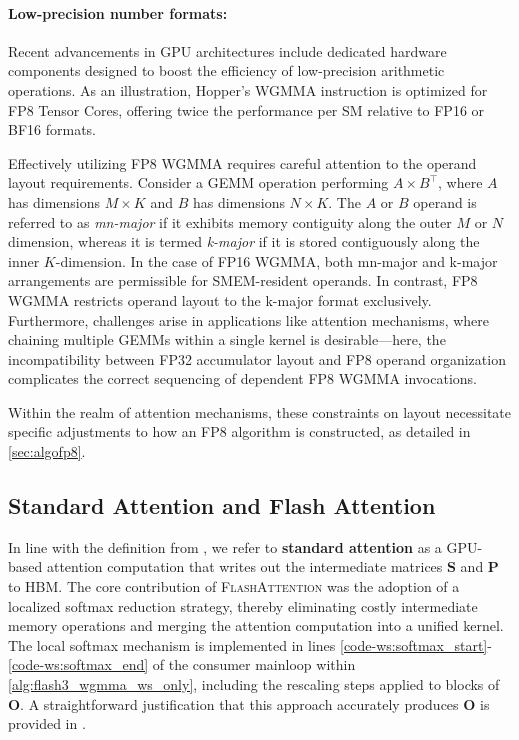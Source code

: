 \begin{enumerate}
\paragraph{Low-precision number formats:}
\label{sec:low-precision-gpu}
Recent advancements in GPU architectures include dedicated hardware components designed to boost the efficiency of low-precision arithmetic operations. As an illustration, Hopper’s WGMMA instruction is optimized for FP8 Tensor Cores, offering twice the performance per SM relative to FP16 or BF16 formats.

Effectively utilizing FP8 WGMMA requires careful attention to the operand layout requirements. Consider a GEMM operation performing $A \times B^{\top}$, where $A$ has dimensions $M \times K$ and $B$ has dimensions $N \times K$. The $A$ or $B$ operand is referred to as \emph{mn-major} if it exhibits memory contiguity along the outer $M$ or $N$ dimension, whereas it is termed \emph{k-major} if it is stored contiguously along the inner $K$-dimension. In the case of FP16 WGMMA, both mn-major and k-major arrangements are permissible for SMEM-resident operands. In contrast, FP8 WGMMA restricts operand layout to the k-major format exclusively. Furthermore, challenges arise in applications like attention mechanisms, where chaining multiple GEMMs within a single kernel is desirable—here, the incompatibility between FP32 accumulator layout and FP8 operand organization complicates the correct sequencing of dependent FP8 WGMMA invocations.

Within the realm of attention mechanisms, these constraints on layout necessitate specific adjustments to how an FP8 algorithm is constructed, as detailed in \cref{sec:algofp8}.

\subsection{Standard Attention and Flash Attention} In line with the definition from \citet{dao2022flashattention}, we refer to \textbf{standard attention} as a GPU-based attention computation that writes out the intermediate matrices $\mathbf{S}$ and $\mathbf{P}$ to HBM. The core contribution of \textsc{FlashAttention} was the adoption of a localized softmax reduction strategy, thereby eliminating costly intermediate memory operations and merging the attention computation into a unified kernel. The local softmax mechanism is implemented in lines \ref{code-ws:softmax_start}-\ref{code-ws:softmax_end} of the consumer mainloop within \cref{alg:flash3_wgmma_ws_only}, including the rescaling steps applied to blocks of $\mathbf{O}$. A straightforward justification that this approach accurately produces $\mathbf{O}$ is provided in \cite[\S 2.3.1]{dao2023flashattention2}.


\end{enumerate}
